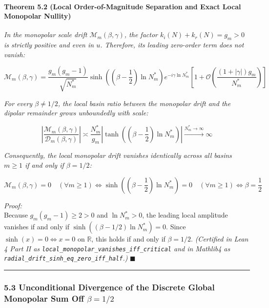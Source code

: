 \documentclass[
  11pt,
]{article}
\begin{document}
\paragraph{Theorem 5.2 (Local Order-of-Magnitude Separation and Exact
Local Monopolar
Nullity)}\label{theorem-5.2-local-order-of-magnitude-separation-and-exact-local-monopolar-nullity}

\emph{In the monopolar scale drift \(\mathcal{M}_m(\beta, \gamma)\), the
factor \(k_i(N) + k_r(N) = g_m > 0\) is strictly positive and even in
\(u\). Therefore, its leading zero-order term does not vanish:}

\[\mathcal{M}_m(\beta, \gamma) = \frac{g_m(g_m - 1)}{\sqrt{N_m^*}} \sinh\left(\left(\beta - \frac{1}{2}\right)\ln N_m^*\right) e^{-i\gamma \ln N_m^*} \left[ 1 + \mathcal{O}\left(\frac{(1+|\gamma|)g_m}{N_m^*}\right) \right]\]

\emph{For every \(\beta \neq 1/2\), the local basin ratio between the
monopolar drift and the dipolar remainder grows unboundedly with scale:}

\[\left| \frac{\mathcal{M}_m(\beta, \gamma)}{\mathcal{D}_m(\beta, \gamma)} \right| \asymp \frac{N_m^*}{g_m} \left| \tanh\left(\left(\beta - \frac{1}{2}\right)\ln N_m^*\right) \right| \xrightarrow{N_m^* \to \infty} \infty\]

\emph{Consequently, the local monopolar drift vanishes identically
across all basins \(m \ge 1\) if and only if \(\beta = 1/2\):}

\[\mathcal{M}_m(\beta, \gamma) = 0 \quad (\forall m \ge 1) \iff \sinh\left(\left(\beta - \frac{1}{2}\right)\ln N_m^*\right) = 0 \quad (\forall m \ge 1) \iff \boxed{\beta = \frac{1}{2}}\]

\emph{Proof:}\\
Because \(g_m(g_m-1) \ge 2 > 0\) and \(\ln N_m^* > 0\), the leading
local amplitude vanishes if and only if
\(\sinh((\beta - 1/2)\ln N_m^*) = 0\). Since \(\sinh(x) = 0 \iff x = 0\)
on \(\mathbb{R}\), this holds if and only if \(\beta = 1/2\).
\emph{(Certified in Lean 4 Part II as
\texttt{local\_monopolar\_vanishes\_iff\_critical} and in Mathlib4 as
\texttt{radial\_drift\_sinh\_eq\_zero\_iff\_half}.)} \(\blacksquare\)

\begin{center}\rule{0.5\linewidth}{0.5pt}\end{center}

\subsubsection{\texorpdfstring{5.3 Unconditional Divergence of the
Discrete Global Monopolar Sum Off
\(\beta = 1/2\)}{5.3 Unconditional Divergence of the Discrete Global Monopolar Sum Off \textbackslash beta = 1/2}}\label{unconditional-divergence-of-the-discrete-global-monopolar-sum-off-beta-12}
\end{document}
